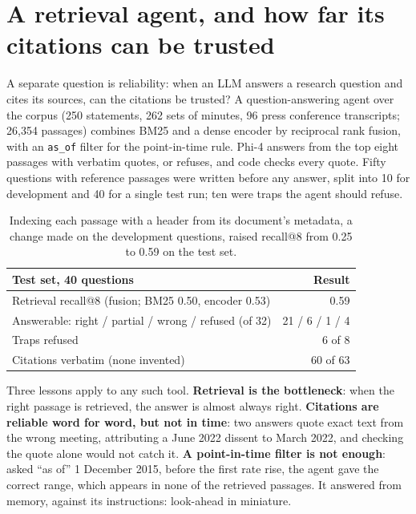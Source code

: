 \documentclass[11pt,a4paper]{article}
\newcommand{\sfb}[1]{{\sffamily\bfseries #1}}
\begin{document}
\section{A retrieval agent, and how far its citations can be trusted}

A separate question is reliability: when an LLM answers a research question and cites its
sources, can the citations be trusted? A question-answering agent over the corpus (250
statements, 262 sets of minutes, 96 press conference transcripts; 26,354 passages) combines
BM25 and a dense encoder by reciprocal rank fusion, with an \texttt{as\_of} filter for the
point-in-time rule. Phi-4 answers from the top eight passages with verbatim quotes, or refuses,
and code checks every quote. Fifty questions with reference passages were written before any
answer, split into 10 for development and 40 for a single test run; ten were traps the agent
should refuse.

\begin{table}[H]
\centering\small
\begin{tabular}{lr}
\toprule
Test set, 40 questions & Result \\
\midrule
Retrieval recall@8 (fusion; BM25 0.50, encoder 0.53) & 0.59 \\
Answerable: right / partial / wrong / refused (of 32)   & 21 / 6 / 1 / 4 \\
Traps refused                                           & 6 of 8 \\
Citations verbatim (none invented)                      & 60 of 63 \\
\bottomrule
\end{tabular}
\caption{Indexing each passage with a header from its document's metadata, a change made on the
development questions, raised recall@8 from 0.25 to 0.59 on the test set.}
\end{table}

Three lessons apply to any such tool. \sfb{Retrieval is the bottleneck}: when the right passage
is retrieved, the answer is almost always right. \sfb{Citations are reliable word for word, but
not in time}: two answers quote exact text from the wrong meeting, attributing a June 2022
dissent to March 2022, and checking the quote alone would not catch it. \sfb{A point-in-time
filter is not enough}: asked ``as of'' 1 December 2015, before the first rate rise, the agent
gave the correct range, which appears in none of the retrieved passages. It answered from
memory, against its instructions: look-ahead in miniature.
\end{document}
